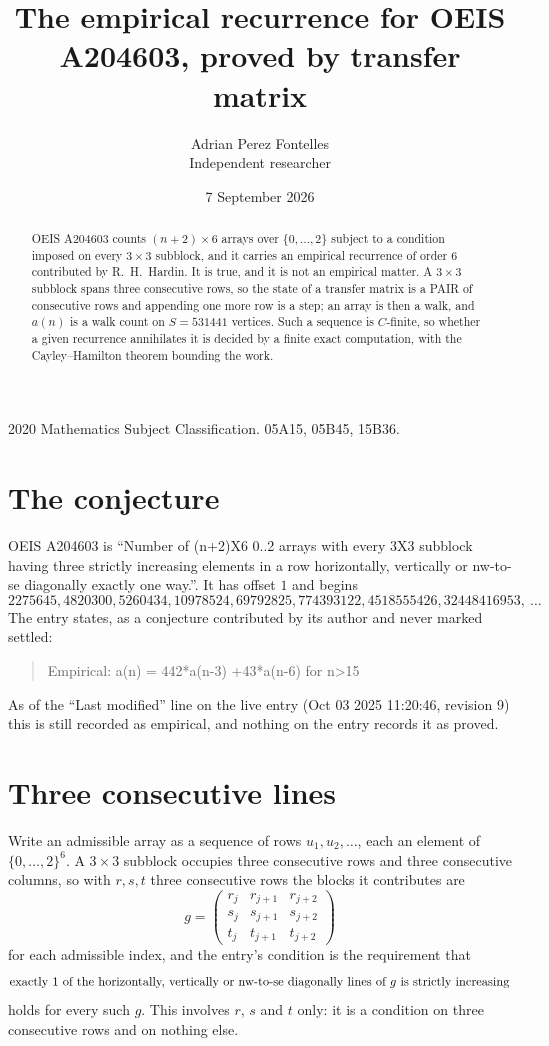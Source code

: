 \documentclass[11pt,a4paper]{article}
\title{The empirical recurrence for OEIS A204603, proved by transfer matrix}
\author{Adrian Perez Fontelles\\ \small Independent researcher}
\date{7 September 2026}
\theoremstyle{plain}
\theoremstyle{definition}
\begin{document}
\maketitle

\begin{abstract}
OEIS A204603 counts $(n+2)\times6$ arrays over $\{0,\dots,2\}$ subject to a condition imposed on
every $3\times3$ subblock, and it carries an empirical recurrence of order $6$
contributed by R.~H.~Hardin. It is true, and it is not an empirical matter. A $3\times3$
subblock spans three consecutive rows, so the state of a transfer matrix is a PAIR of
consecutive rows and appending one more row is a step; an array is then a walk, and
$a(n)$ is a walk count on $S=531441$ vertices. Such a sequence is $C$-finite, so whether a given
recurrence annihilates it is decided by a finite exact computation, with the Cayley--Hamilton
theorem bounding the work.
\end{abstract}

\noindent\small 2020 Mathematics Subject Classification. 05A15, 05B45, 15B36.\normalsize

\section{The conjecture}

OEIS A204603 is ``Number of (n+2)X6 0..2 arrays with every 3X3 subblock having three strictly increasing elements in a row horizontally, vertically or nw-to-se diagonally exactly one way.''. It has offset $1$ and begins
\[
2275645, 4820300, 5260434, 10978524, 69792825, 774393122, 4518555426, 32448416953,\ \dots
\]
The entry states, as a conjecture contributed by its author and never marked settled:
\begin{quote}
Empirical: a(n) = 442*a(n-3) +43*a(n-6) for n>15
\end{quote}
As of the ``Last modified'' line on the live entry (Oct 03 2025 11:20:46, revision 9) this is still
recorded as empirical, and nothing on the entry records it as proved.

\section{Three consecutive lines}

Write an admissible array as a sequence of rows $u_1,u_2,\dots$, each an element of
$\{0,\dots,2\}^{6}$. A $3\times3$ subblock occupies three consecutive rows and
three consecutive columns, so with $r,s,t$ three consecutive rows the blocks it
contributes are
\[
g=\begin{pmatrix}r_j&r_{j+1}&r_{j+2}\\ s_j&s_{j+1}&s_{j+2}\\ t_j&t_{j+1}&t_{j+2}\end{pmatrix}
\]
for each admissible index, and the entry's condition is the requirement that
\[
\text{exactly }1\text{ of the horizontally, vertically or nw-to-se diagonally lines of }g\text{ \text{is strictly increasing}}
\]
holds for every such $g$. This involves $r$, $s$ and $t$ only: it is a condition on
three consecutive rows and on nothing else.
\end{document}
